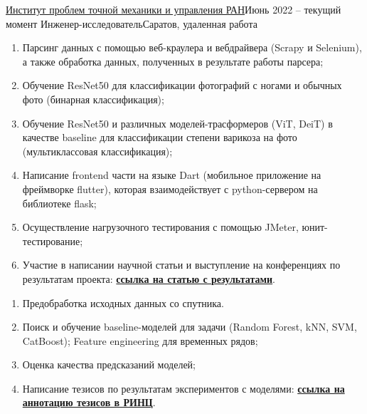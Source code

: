 \documentclass[letterpaper,11pt]{article}
\begin{document}
    \resumeSubheading
    {\href{link_to_company}{\underline{Институт проблем точной механики и управления РАН}}}{Июнь 2022 -- текущий момент}
    {Инженер-исследователь}{Саратов, удаленная работа}
    \resumeItemListStart

            \begin{enumerate}
                \item Парсинг данных с помощью веб-краулера и вебдрайвера (Scrapy и Selenium), а также обработка данных, полученных в результате работы парсера;
                \item Обучение ResNet50 для классификации фотографий с ногами и обычных фото (бинарная классификация);
                \item Обучение ResNet50 и различных моделей-трасформеров (ViT, DeiT) в качестве baseline для классификации степени варикоза на фото (мультиклассовая классификация);
                \item Написание frontend части на языке Dart (мобильное приложение на фреймворке flutter), которая взаимодействует с python-сервером на библиотеке flask;
                \item Осуществление нагрузочного тестирования с помощью JMeter, юнит-тестирование;
                \item Участие в написании научной статьи и выступление на конференциях по результатам проекта: \href{https://www.mdpi.com/2227-7390/10/19/3571}{\textbf{ссылка на статью с результатами}}.
            \end{enumerate}


            \begin{enumerate}
                \item Предобработка исходных данных со спутника.
                \item Поиск и обучение baseline-моделей для задачи (Random Forest, kNN, SVM, CatBoost); Feature engineering для временных рядов;
                \item Оценка качества предсказаний моделей;
                \item Написание тезисов по результатам экспериментов с моделями: \href{https://www.elibrary.ru/bgrpzs}{\textbf{ссылка на аннотацию тезисов в РИНЦ}}.
            \end{enumerate}
        
\end{document}

